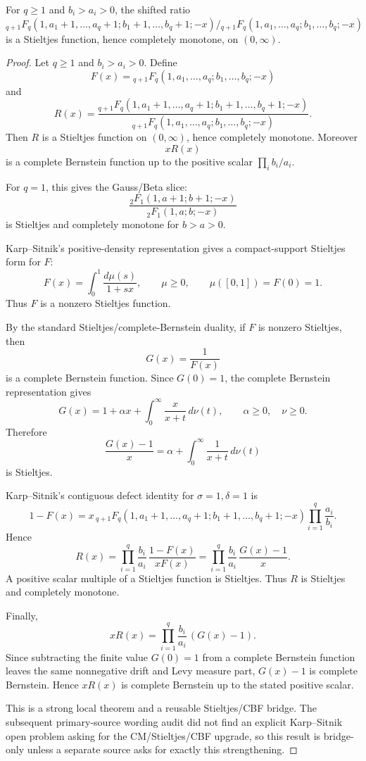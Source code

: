 \begin{proposition}
\label{res:ks-general-q-delta1-sigma1-ratio-stieltjes-cm}
For \(q\ge1\) and \(b_i>a_i>0\), the shifted ratio \({}_{q+1}F_q(1,a_1+1,\ldots,a_q+1;b_1+1,\ldots,b_q+1;-x)/{}_{q+1}F_q(1,a_1,\ldots,a_q;b_1,\ldots,b_q;-x)\) is a Stieltjes function, hence completely monotone, on \((0,\infty)\).
\end{proposition}
\begin{proof}
Let \(q\ge1\) and \(b_i>a_i>0\). Define
\[
F(x)={}_{q+1}F_q(1,a_1,\ldots,a_q;b_1,\ldots,b_q;-x)
\]
and
\[
R(x)=
\frac{{}_{q+1}F_q(1,a_1+1,\ldots,a_q+1;b_1+1,\ldots,b_q+1;-x)}
{{}_{q+1}F_q(1,a_1,\ldots,a_q;b_1,\ldots,b_q;-x)}.
\]
Then \(R\) is a Stieltjes function on \((0,\infty)\), hence completely monotone. Moreover
\[
xR(x)
\]
is a complete Bernstein function up to the positive scalar \(\prod_i b_i/a_i\).

For \(q=1\), this gives the Gauss/Beta slice:
\[
\frac{{}_2F_1(1,a+1;b+1;-x)}{{}_2F_1(1,a;b;-x)}
\]
is Stieltjes and completely monotone for \(b>a>0\).

Karp--Sitnik's positive-density representation gives a compact-support Stieltjes form for \(F\):
\[
F(x)=\int_0^1 \frac{d\mu(s)}{1+sx},
\qquad \mu\ge0,
\qquad \mu([0,1])=F(0)=1.
\]
Thus \(F\) is a nonzero Stieltjes function.

By the standard Stieltjes/complete-Bernstein duality, if \(F\) is nonzero Stieltjes, then
\[
G(x)=\frac1{F(x)}
\]
is a complete Bernstein function. Since \(G(0)=1\), the complete Bernstein representation gives
\[
G(x)=1+\alpha x+\int_0^\infty \frac{x}{x+t}\,d\nu(t),
\qquad \alpha\ge0,\quad \nu\ge0.
\]
Therefore
\[
\frac{G(x)-1}{x}
=\alpha+\int_0^\infty \frac{1}{x+t}\,d\nu(t)
\]
is Stieltjes.

Karp--Sitnik's contiguous defect identity for \(\sigma=1,\delta=1\) is
\[
1-F(x)
=x\,{}_{q+1}F_q(1,a_1+1,\ldots,a_q+1;b_1+1,\ldots,b_q+1;-x)
\prod_{i=1}^q\frac{a_i}{b_i}.
\]
Hence
\[
R(x)=
\prod_{i=1}^q\frac{b_i}{a_i}\,
\frac{1-F(x)}{xF(x)}
=
\prod_{i=1}^q\frac{b_i}{a_i}\,
\frac{G(x)-1}{x}.
\]
A positive scalar multiple of a Stieltjes function is Stieltjes. Thus \(R\) is Stieltjes and completely monotone.

Finally,
\[
xR(x)=\prod_{i=1}^q\frac{b_i}{a_i}\,(G(x)-1).
\]
Since subtracting the finite value \(G(0)=1\) from a complete Bernstein function leaves the same nonnegative drift and Levy measure part, \(G(x)-1\) is complete Bernstein. Hence \(xR(x)\) is complete Bernstein up to the stated positive scalar.

This is a strong local theorem and a reusable Stieltjes/CBF bridge. The subsequent primary-source wording audit did not find an explicit Karp--Sitnik open problem asking for the CM/Stieltjes/CBF upgrade, so this result is bridge-only unless a separate source asks for exactly this strengthening.
\end{proof}

